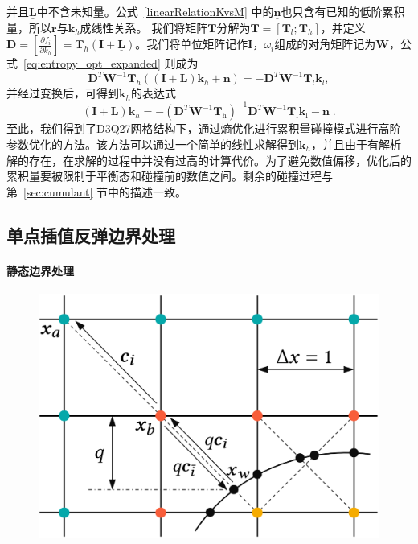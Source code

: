 并且$\bm{\underline{L}}$中不含未知量。公式~\ref{linearRelationKvsM} 中的$\bm{\underline{n}}$也只含有已知的低阶累积量，所以$\bm{r}$与$\bm{k}_h$成线性关系。
我们将矩阵$\bm{T}$分解为$\bm{T} = [\bm{T}_l; \bm{T}_h]$，并定义$\bm{D} = [\frac{\partial f_i}{\partial k_h}] = \bm{T}_h(\bm{I} + \bm{\underline{L}})$。我们将单位矩阵记作$\bm{I}$，$\omega_i$组成的对角矩阵记为$\bm{W}$，公式~\ref{eq:entropy_opt_expanded} 则成为
\begin{equation}
    \bm{D}^T \bm{W}^{-1} \bm{T}_h ((\bm{I} + \bm{\underline{L}}) \bm{k}_h + \bm{\underline{n}}) = -\bm{D}^T \bm{W}^{-1} \bm{T}_l \bm{k}_l,
\end{equation}
并经过变换后，可得到$\bm{k}_h$的表达式
\begin{equation} \label{eq:solution}
	(\bm{I} + \bm{\underline{L}}) \bm{k}_h =  -(\bm{D}^T \bm{W}^{-1} \bm{T}_\text{h})^{-1}\bm{D}^T \bm{W}^{-1} \bm{T}_\text{l} \bm{k}_\text{l} - \bm{\underline{n}} \;.
\end{equation}
至此，我们得到了D3Q27网格结构下，通过熵优化进行累积量碰撞模式进行高阶参数优化的方法。该方法可以通过一个简单的线性求解得到$\bm{k}_h$，并且由于有解析解的存在，在求解的过程中并没有过高的计算代价。为了避免数值偏移，优化后的累积量要被限制于平衡态和碰撞前的数值之间。剩余的碰撞过程与第~\ref{sec:cumulant} 节中的描述一致。

\subsection{单点插值反弹边界处理}
\paragraph{静态边界处理}
\begin{figure}[htb]
  \centering
    \includegraphics[width=0.7\columnwidth]{figures/boundary.png}
  \label{img:boundary}
\end{figure}

